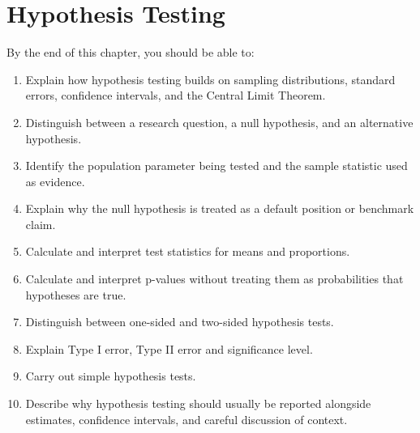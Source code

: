 \documentclass[
  letterpaper,
  DIV=11,
  numbers=noendperiod]{scrreprt}
\providecommand{\tightlist}{%
  \setlength{\itemsep}{0pt}\setlength{\parskip}{0pt}}
\begin{document}

\chapter{Hypothesis Testing}\label{hypothesis-testing}

\begin{tcolorbox}[enhanced jigsaw, arc=.35mm, bottomrule=.15mm, bottomtitle=1mm, breakable, colback=white, colbacktitle=quarto-callout-note-color!10!white, colframe=quarto-callout-note-color-frame, coltitle=black, left=2mm, leftrule=.75mm, opacityback=0, opacitybacktitle=0.6, rightrule=.15mm, title=\textcolor{quarto-callout-note-color}{\faInfo}\hspace{0.5em}{Learning Objectives}, titlerule=0mm, toprule=.15mm, toptitle=1mm]

By the end of this chapter, you should be able to:

\begin{enumerate}
\def\labelenumi{\arabic{enumi}.}
\tightlist
\item
  Explain how hypothesis testing builds on sampling distributions,
  standard errors, confidence intervals, and the Central Limit Theorem.
\item
  Distinguish between a research question, a null hypothesis, and an
  alternative hypothesis.
\item
  Identify the population parameter being tested and the sample
  statistic used as evidence.
\item
  Explain why the null hypothesis is treated as a default position or
  benchmark claim.
\item
  Calculate and interpret test statistics for means and proportions.
\item
  Calculate and interpret p-values without treating them as
  probabilities that hypotheses are true.
\item
  Distinguish between one-sided and two-sided hypothesis tests.
\item
  Explain Type I error, Type II error and significance level.
\item
  Carry out simple hypothesis tests.
\item
  Describe why hypothesis testing should usually be reported alongside
  estimates, confidence intervals, and careful discussion of context.
\end{enumerate}

\end{tcolorbox}
\end{document}
